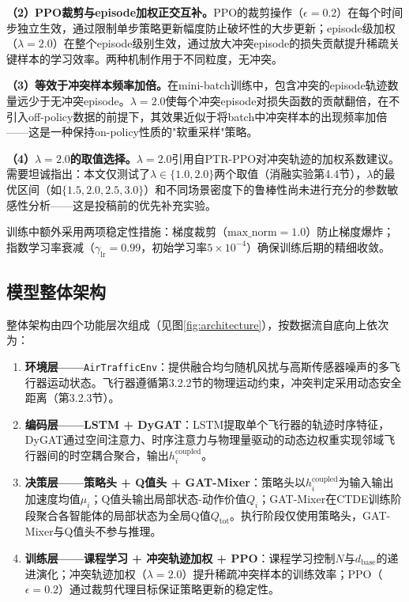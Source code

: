 \documentclass[12pt,a4paper,UTF8]{ctexart}
\begin{document}
\textbf{（2）PPO裁剪与episode加权正交互补。}PPO的裁剪操作（$\epsilon=0.2$）在每个时间步独立生效，通过限制单步策略更新幅度防止破坏性的大步更新；episode级加权（$\lambda=2.0$）在整个episode级别生效，通过放大冲突episode的损失贡献提升稀疏关键样本的学习效率。两种机制作用于不同粒度，无冲突。

\textbf{（3）等效于冲突样本频率加倍。}在mini-batch训练中，包含冲突的episode轨迹数量远少于无冲突episode。$\lambda=2.0$使每个冲突episode对损失函数的贡献翻倍，在不引入off-policy数据的前提下，其效果近似于将batch中冲突样本的出现频率加倍——这是一种保持on-policy性质的"软重采样"策略。

\textbf{（4）$\lambda=2.0$的取值选择。}$\lambda=2.0$引用自PTR-PPO\cite{ref21}对冲突轨迹的加权系数建议。需要坦诚指出：本文仅测试了$\lambda \in \{1.0, 2.0\}$两个取值（消融实验第4.4节），$\lambda$的最优区间（如$\{1.5, 2.0, 2.5, 3.0\}$）和不同场景密度下的鲁棒性尚未进行充分的参数敏感性分析——这是投稿前的优先补充实验。

训练中额外采用两项稳定性措施：梯度裁剪（$\text{max\_norm}=1.0$）防止梯度爆炸；指数学习率衰减（$\gamma_{\text{lr}}=0.99$，初始学习率$5 \times 10^{-4}$）确保训练后期的精细收敛。

\subsection{模型整体架构}

整体架构由四个功能层次组成（见图\ref{fig:architecture}），按数据流自底向上依次为：

\begin{enumerate}[label=(\arabic*)]
    \item \textbf{环境层——}\texttt{AirTrafficEnv}：提供融合均匀随机风扰与高斯传感器噪声的多飞行器运动状态。飞行器遵循第3.2.2节的物理运动约束，冲突判定采用动态安全距离（第3.2.3节）。
    \item \textbf{编码层——LSTM + DyGAT}：LSTM提取单个飞行器的轨迹时序特征，DyGAT通过空间注意力、时序注意力与物理量驱动的动态边权重实现邻域飞行器间的时空耦合聚合，输出$h_i^{\text{coupled}}$。
    \item \textbf{决策层——策略头 + Q值头 + GAT-Mixer}：策略头以$h_i^{\text{coupled}}$为输入输出加速度均值$\mu_i$；Q值头输出局部状态-动作价值$Q_i$；GAT-Mixer在CTDE训练阶段聚合各智能体的局部状态为全局Q值$Q_{\text{tot}}$。执行阶段仅使用策略头，GAT-Mixer与Q值头不参与推理。
    \item \textbf{训练层——课程学习 + 冲突轨迹加权 + PPO}：课程学习控制$N$与$d_{\text{base}}$的递进演化；冲突轨迹加权（$\lambda=2.0$）提升稀疏冲突样本的训练效率；PPO（$\epsilon=0.2$）通过裁剪代理目标保证策略更新的稳定性。
\end{enumerate}
\end{document}
